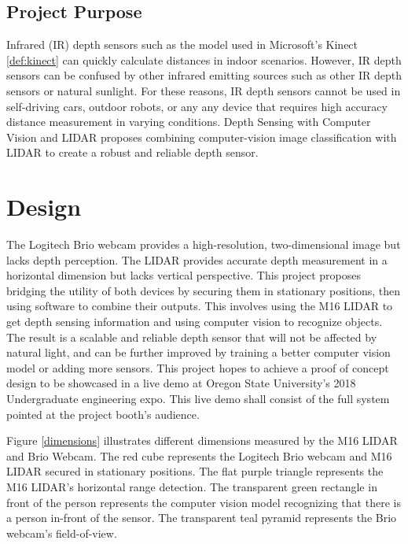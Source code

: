 \documentclass[onecolumn, draftclsnofoot,10pt, compsoc]{IEEEtran}
\begin{document}
\begin{singlespace}
	\subsection{Project Purpose}
		Infrared (IR) depth sensors such as the model used in Microsoft's Kinect \ref{def:kinect} can quickly calculate distances in indoor scenarios.
		However, IR depth sensors can be confused by other infrared emitting sources such as other IR depth sensors or natural sunlight.
		For these reasons, IR depth sensors cannot be used in self-driving cars, outdoor robots, or any any device that requires high accuracy distance measurement in varying conditions.
		Depth Sensing with Computer Vision and LIDAR proposes combining computer-vision image classification with LIDAR to create a robust and reliable depth sensor.

	\section{Design}
		The Logitech Brio webcam provides a high-resolution, two-dimensional image but lacks depth perception.
		The LIDAR provides accurate depth measurement in a horizontal dimension but lacks vertical perspective.
		This project proposes bridging the utility of both devices by securing them in stationary positions, then using software to combine their outputs.
		This involves using the M16 LIDAR to get depth sensing information and using computer vision to recognize objects.
		The result is a scalable and reliable depth sensor that will not be affected by natural light, and can be further improved by training a better computer vision model or adding more sensors.
		This project hopes to achieve a proof of concept design to be showcased in a live demo at Oregon State University's 2018 Undergraduate engineering expo.			
		This live demo shall consist of the full system pointed at the project booth's audience. 

		Figure \ref{dimensions} illustrates different dimensions measured by the M16 LIDAR and Brio Webcam.
		The red cube represents the Logitech Brio webcam and M16 LIDAR secured in stationary positions.
		The flat purple triangle represents the M16 LIDAR's horizontal range detection.
		The transparent green rectangle in front of the person represents the computer vision model recognizing that there is a person in-front of the sensor.
		The transparent teal pyramid represents the Brio webcam's field-of-view.
		

\end{singlespace}
\end{document}
